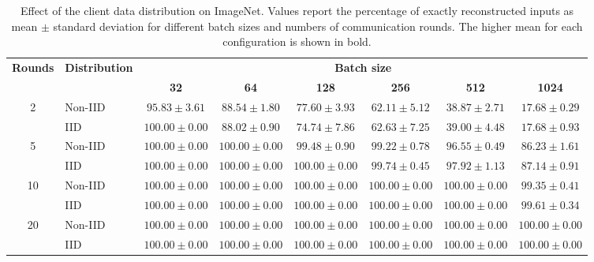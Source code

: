 \begin{table}[t]
    \centering
    \scriptsize
    \setlength{\tabcolsep}{2.5pt}
    \renewcommand{\arraystretch}{1.08}
    \caption{Effect of the client data distribution on ImageNet. Values report the percentage of exactly reconstructed inputs as mean $\pm$ standard deviation for different batch sizes and numbers of communication rounds. The higher mean for each configuration is shown in bold.}
    \label{tab:effect_data_dist}
    \begin{tabular}{@{}clcccccc@{}}
        \toprule
        \textbf{Rounds} & \textbf{Distribution}
        & \multicolumn{6}{c}{\textbf{Batch size}} \\
        \cmidrule(l){3-8}
        & & \textbf{32} & \textbf{64} & \textbf{128}
          & \textbf{256} & \textbf{512} & \textbf{1024} \\
        \midrule
        \multirow{2}{*}{2}
        & Non-IID & $95.83 \pm 3.61$ & $\mathbf{88.54} \pm 1.80$ & $\mathbf{77.60} \pm 3.93$
                  & $62.11 \pm 5.12$ & $38.87 \pm 2.71$ & $\mathbf{17.68} \pm 0.29$ \\
        & IID     & $\mathbf{100.00} \pm 0.00$ & $88.02 \pm 0.90$ & $74.74 \pm 7.86$
                  & $\mathbf{62.63} \pm 7.25$ & $\mathbf{39.00} \pm 4.48$ & $\mathbf{17.68} \pm 0.93$ \\
        \midrule
        \multirow{2}{*}{5}
        & Non-IID & $\mathbf{100.00} \pm 0.00$ & $\mathbf{100.00} \pm 0.00$ & $99.48 \pm 0.90$
                  & $99.22 \pm 0.78$ & $96.55 \pm 0.49$ & $86.23 \pm 1.61$ \\
        & IID     & $\mathbf{100.00} \pm 0.00$ & $\mathbf{100.00} \pm 0.00$ & $\mathbf{100.00} \pm 0.00$
                  & $\mathbf{99.74} \pm 0.45$ & $\mathbf{97.92} \pm 1.13$ & $\mathbf{87.14} \pm 0.91$ \\
        \midrule
        \multirow{2}{*}{10}
        & Non-IID & $\mathbf{100.00} \pm 0.00$ & $\mathbf{100.00} \pm 0.00$ & $\mathbf{100.00} \pm 0.00$
                  & $\mathbf{100.00} \pm 0.00$ & $\mathbf{100.00} \pm 0.00$ & $99.35 \pm 0.41$ \\
        & IID     & $\mathbf{100.00} \pm 0.00$ & $\mathbf{100.00} \pm 0.00$ & $\mathbf{100.00} \pm 0.00$
                  & $\mathbf{100.00} \pm 0.00$ & $\mathbf{100.00} \pm 0.00$ & $\mathbf{99.61} \pm 0.34$ \\
        \midrule
        \multirow{2}{*}{20}
        & Non-IID & $\mathbf{100.00} \pm 0.00$ & $\mathbf{100.00} \pm 0.00$ & $\mathbf{100.00} \pm 0.00$
                  & $\mathbf{100.00} \pm 0.00$ & $\mathbf{100.00} \pm 0.00$ & $\mathbf{100.00} \pm 0.00$ \\
        & IID     & $\mathbf{100.00} \pm 0.00$ & $\mathbf{100.00} \pm 0.00$ & $\mathbf{100.00} \pm 0.00$
                  & $\mathbf{100.00} \pm 0.00$ & $\mathbf{100.00} \pm 0.00$ & $\mathbf{100.00} \pm 0.00$ \\
        \bottomrule
    \end{tabular}
\end{table}

